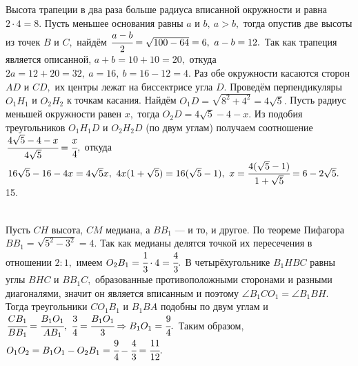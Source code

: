 \documentclass[12pt]{article}
\begin{document}
Высота трапеции в два раза больше радиуса вписанной окружности и равна $2\cdot4=8.$ Пусть меньшее основания равны $a$ и $b,\ a>b,$ тогда опустив две высоты из точек $B$ и $C,$ найдём $\cfrac{a-b}{2}=\sqrt{100-64}=6,\ a-b=12.$ Так как трапеция является описанной, $a+b=10+10=20,$ откуда $2a=12+20=32,\ a=16,\ b=16-12=4.$ Раз обе окружности касаются сторон $AD$ и $CD,$ их центры лежат на биссектрисе угла $D.$ Проведём перпендикуляры $O_1H_1$ и $O_2H_2$ к точкам касания. Найдём $O_1D=\sqrt{8^2+4^2}=4\sqrt{5}.$ Пусть радиус меньшей окружности равен $x,$ тогда  $O_2D=4\sqrt{5}-4-x.$ Из подобия треугольников $O_1H_1D$ и $O_2H_2D$ (по двум углам) получаем соотношение $\cfrac{4\sqrt{5}-4-x }{4\sqrt{5}}=\cfrac{x}{4},$ откуда $16\sqrt{5}-16-4x=4\sqrt{5}x,\ 4x(1+\sqrt{5})=16(\sqrt{5}-1),\ x=\cfrac{4(\sqrt{5}-1)}{1+\sqrt{5}}=6-2\sqrt{5}.$\\
15. \begin{figure}[ht!]
\end{figure}\\
Пусть $CH$ высота, $CM$ медиана, а $BB_1$ --- и то, и другое. По теореме Пифагора $BB_1=\sqrt{5^2-3^2}=4.$ Так как медианы делятся точкой их пересечения в отношении $2:1,$ имеем $O_2B_1=\cfrac{1}{3}\cdot4=\cfrac{4}{3}.$ В четырёхугольнике $B_1HBC$ равны углы $BHC$ и $BB_1C,$ образованные противоположными сторонами и разными диагоналями, значит он является вписанным и поэтому $\angle B_1CO_1=\angle B_1BH.$ Тогда треугольники $CO_1B_1$ и $B_1BA$ подобны по двум углам и  $\cfrac{CB_1}{BB_1}=\cfrac{B_1O_1}{AB_1},\ \cfrac{3}{4}=\cfrac{B_1O_1}{3}\Rightarrow B_1O_1=\cfrac{9}{4}.$ Таким образом, $O_1O_2=B_1O_1-O_2B_1=\cfrac{9}{4}-\cfrac{4}{3}=\cfrac{11}{12}.$\\
\end{document}
